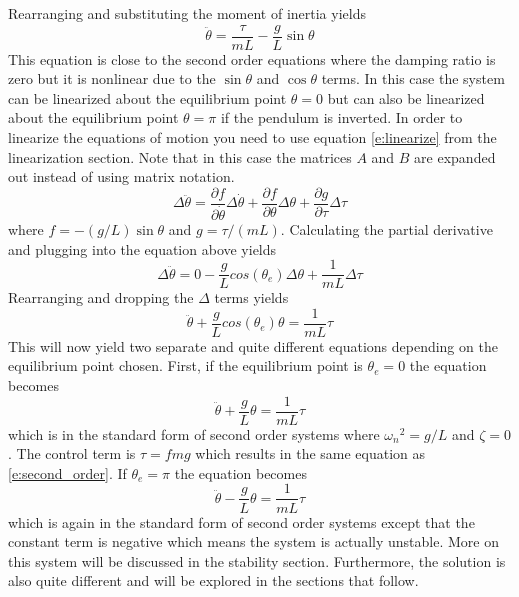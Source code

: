 Rearranging and substituting the moment of inertia yields
\begin{equation}
    \ddot{\theta} = \frac{\tau}{mL} - \frac{g}{L} \sin{\theta}
\end{equation}
This equation is close to the second order equations where the damping ratio is zero but it is nonlinear due to the $\sin{\theta}$ and $\cos{\theta}$ terms. In this case the system can be linearized about the equilibrium point $\theta=0$ but can also be linearized about the equilibrium point $\theta=\pi$ if the pendulum is inverted. In order to linearize the equations of motion you need to use equation \ref{e:linearize} from the linearization section. Note that in this case the matrices $A$ and $B$ are expanded out instead of using matrix notation.
\begin{equation}
    \Delta \ddot{\theta} = \frac{\partial f}{\partial \dot{\theta}} \Delta \dot{\theta} + \frac{\partial f}{\partial \theta}\Delta \theta + \frac{\partial g}{\partial \tau} \Delta \tau 
\end{equation}
where $f = -(g/L) \sin{\theta}$ and $g = \tau/(mL)$. Calculating the partial derivative and plugging into the equation above yields
\begin{equation}
    \Delta \ddot{\theta} = 0 -\frac{g}{L}cos(\theta_e)\Delta \theta + \frac{1}{mL} \Delta \tau
\end{equation}
Rearranging and dropping the $\Delta$ terms yields
\begin{equation}
    \ddot{\theta} + \frac{g}{L}cos(\theta_e)\theta = \frac{1}{mL} \tau
\end{equation}
This will now yield two separate and quite different equations depending on the equilibrium point chosen. First, if the equilibrium point is $\theta_e=0$ the equation becomes
\begin{equation}
    \ddot{\theta} + \frac{g}{L}\theta = \frac{1}{mL} \tau
\end{equation}
which is in the standard form of second order systems where ${\omega_n}^2 = g/L$ and $\zeta = 0$. The control term is $\tau = fmg$ which results in the same equation as \ref{e:second_order}. If $\theta_e=\pi$ the equation becomes
\begin{equation}
    \ddot{\theta} - \frac{g}{L}\theta = \frac{1}{mL} \tau
\end{equation}
which is again in the standard form of second order systems except that the constant term is negative which means the system is actually unstable. More on this system will be discussed in the stability section. Furthermore, the solution is also quite different and will be explored in the sections that follow.


